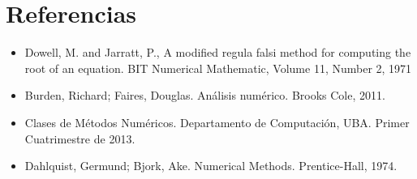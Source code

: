 \section{Referencias}

\begin{itemize}

  \item \nocite {Dowell} Dowell, M. and Jarratt, P., A modified regula falsi method for computing the root of an equation.
      BIT Numerical Mathematic, Volume 11, Number 2, 1971
  \item \nocite {Burden} Burden, Richard; Faires, Douglas. An\'alisis 
num\'erico. Brooks Cole, 2011.
  \item \nocite {MN} Clases de M\'etodos Num\'ericos. Departamento de 
Computaci\'on, UBA. Primer Cuatrimestre de 2013.
  \item \nocite {Dahlquist} Dahlquist, Germund; Bjork, Ake. Numerical Methods. 
Prentice-Hall, 1974.
\end{itemize}
